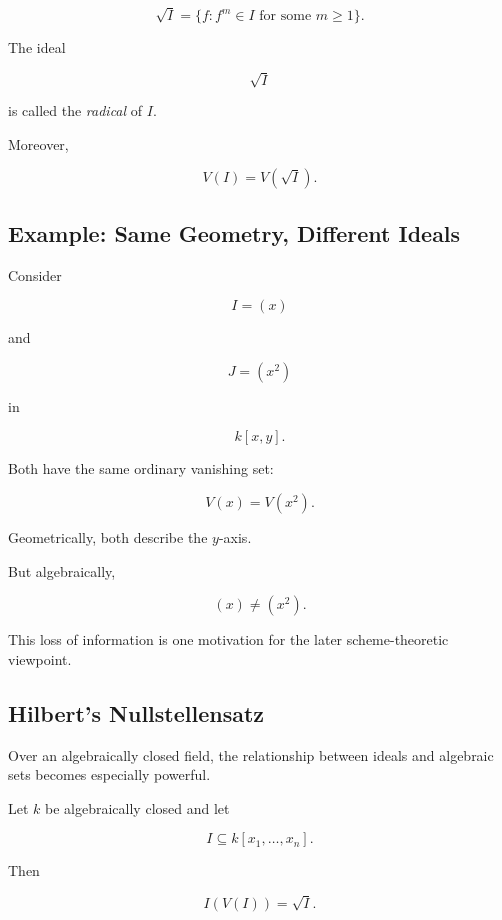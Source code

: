 \[
\boxed{
\sqrt{I}
=
\{
f:
f^m\in I
\text{ for some }m\geq1
\}.
}
\]

The ideal

\[
\sqrt{I}
\]

is called the \emph{radical} of \(I\).

Moreover,

\[
\boxed{
V(I)=V(\sqrt{I}).
}
\]

\subsection{Example: Same Geometry, Different Ideals}
\label{subsec:same-geometry-different-ideals}

Consider

\[
I=(x)
\]

and

\[
J=(x^2)
\]

in

\[
k[x,y].
\]

Both have the same ordinary vanishing set:

\[
\boxed{
V(x)=V(x^2).
}
\]

Geometrically, both describe the \(y\)-axis.

But algebraically,

\[
(x)\neq(x^2).
\]

This loss of information is one motivation for the later scheme-theoretic
viewpoint.

\subsection{Hilbert's Nullstellensatz}
\label{subsec:nullstellensatz}

Over an algebraically closed field, the relationship between ideals and
algebraic sets becomes especially powerful.

\begin{theorem}
Let \(k\) be algebraically closed and let

\[
I\subseteq k[x_1,\ldots,x_n].
\]

Then

\[
\boxed{
I(V(I))=\sqrt{I}.
}
\]
\end{theorem}

